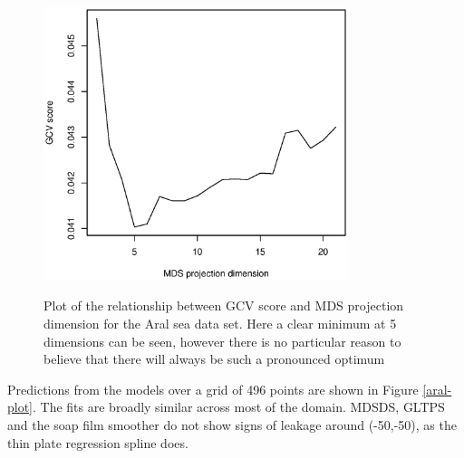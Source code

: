 \documentclass[smallextended]{svjour3}       %
\begin{document}
\begin{figure}
\centering
\includegraphics[width=3.5in]{Fig6.eps} \\
\caption{Plot of the relationship between GCV score and MDS projection dimension for the Aral sea data set. Here a clear minimum at 5 dimensions can be seen, however there is no particular reason to believe that there will always be such a pronounced optimum}
\label{aral-gcvplot}
\end{figure}

Predictions from the models over a grid of 496 points are shown in Figure \ref{aral-plot}. The fits are broadly similar across most of the domain. MDSDS, GLTPS and the soap film smoother do not show signs of leakage around (-50,-50), as the thin plate regression spline does.
\end{document}
